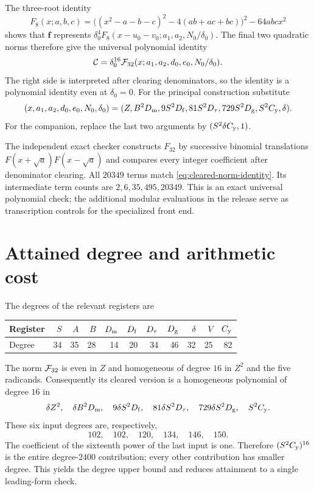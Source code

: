 The three-root identity
\[
 F_8(x;a,b,c)
 =\bigl((x^2-a-b-c)^2-4(ab+ac+bc)\bigr)^2-64abcx^2
\]
shows that $\mathbf f$ represents
$\delta_0^4F_8(x-u_0-v_0;a_1,a_2,N_0/\delta_0)$.
The final two quadratic norms therefore give the universal polynomial
identity
\begin{equation}\label{eq:cleared-norm-identity}
 \mathcal C
 =\delta_0^{16}\mathcal F_{32}(x;a_1,a_2,d_0,e_0,N_0/\delta_0).
\end{equation}
The right side is interpreted after clearing denominators, so the identity
is a polynomial identity even at $\delta_0=0$.
For the principal construction substitute
\[
 (x,a_1,a_2,d_0,e_0,N_0,\delta_0)
 =(Z,B^2D_{\mathrm m},9S^2D_{\mathrm f},81S^2D_{\tau},729S^2D_{\mathrm g},S^2C_{\mathrm y},\delta).
\]
For the companion, replace the last two arguments by
$(S^2\delta C_{\mathrm y},1)$.

The independent exact checker constructs $F_{32}$ by successive binomial
translations $F(x+\sqrt a)F(x-\sqrt a)$ and compares every integer
coefficient after denominator clearing. All $20349$ terms match
\eqref{eq:cleared-norm-identity}. Its intermediate term counts are
$2,6,35,495,20349$. This is an exact universal polynomial check;
the additional modular evaluations in the release serve as transcription
controls for the specialized front end.

\section{Attained degree and arithmetic cost}\label{sec:degree}

The degrees of the relevant registers are
\begin{center}\small
\begin{tabular}{@{}lrrrrrrrrrr@{}}\toprule
Register &$S$&$A$&$B$&$D_{\mathrm m}$&$D_{\mathrm f}$&$D_{\tau}$&$D_{\mathrm g}$&$\delta$&$V$&$C_{\mathrm y}$\\
\midrule
Degree &34&35&28&14&20&34&46&32&25&82\\\bottomrule
\end{tabular}
\end{center}
The norm $\mathcal F_{32}$ is even in $Z$ and homogeneous of degree $16$ in
$Z^2$ and the five radicands. Consequently its cleared version is a
homogeneous polynomial of degree $16$ in
\[
 \delta Z^2,\quad \delta B^2D_{\mathrm m},\quad9\delta S^2D_{\mathrm f},
 \quad81\delta S^2D_{\tau},\quad729\delta S^2D_{\mathrm g},\quad S^2C_{\mathrm y}.
\]
These six input degrees are, respectively,
\[
 102,\quad102,\quad120,\quad134,\quad146,\quad150.
\]
The coefficient of the sixteenth power of the last input is one.
Therefore $(S^2C_{\mathrm y})^{16}$ is the entire degree-$2400$ contribution;
every other contribution has smaller degree. This yields the degree
upper bound and reduces attainment to a single leading-form check.

